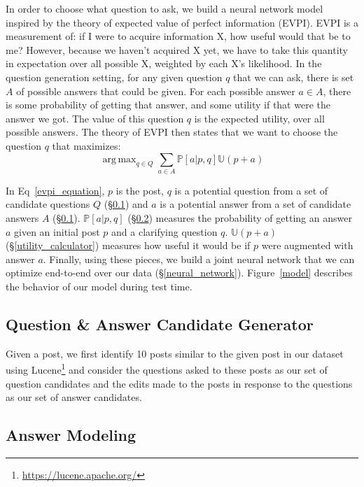 \documentclass[11pt,a4paper]{article}
\DeclareMathOperator*{\argmax}{arg\,max}
\newcommand{\U}{\mathbb{U}}
\begin{document}
In order to choose what question to ask, we build a neural network model inspired by the theory of expected value of perfect information (EVPI). EVPI is a measurement of: if I were to acquire information X, how useful would that be to me? However, because we haven't acquired X yet, we have to take this quantity in expectation over all possible X, weighted by each X's likelihood. In the question generation setting, for any given question $q$ that we can ask, there is set $A$ of possible answers that could be given. For each possible answer $a \in A$, there is some probability of getting that answer, and some utility if that were the answer we got. The value of this question $q$ is the expected utility, over all possible answers. The theory of EVPI then states that we want to choose the question $q$ that maximizes:
\begin{equation}\label{evpi_equation}
\argmax_{q \in Q} \sum_{a \in A} \mathbb{P}[a | p,q] \U(p+a)
\end{equation} 

In Eq~\ref{evpi_equation}, $p$ is the post, $q$ is a potential question from a set of candidate questions $Q$ (\S\ref{question_candidate_generator}) and $a$ is a potential answer from a set of candidate answers $A$ (\S\ref{question_candidate_generator}). $\mathbb{P}[a | p,q]$ (\S\ref{answer_modeling}) measures the probability of getting an answer $a$ given an initial post $p$ and a clarifying question $q$. $\U(p+a)$ (\S\ref{utility_calculator}) measures how useful it would be if $p$ were augmented with answer $a$. Finally, using these pieces, we build a joint neural network that we can optimize end-to-end over our data (\S\ref{neural_network}). Figure~\ref{model} describes the behavior of our model during test time. 

\subsection{Question \& Answer Candidate Generator}\label{question_candidate_generator}

Given a post, we first identify 10 posts similar to the given post in our dataset using Lucene\footnote{\url{https://lucene.apache.org/}} and consider the questions asked to these posts as our set of question candidates and the edits made to the posts in response to the questions as our set of answer candidates.

\subsection{Answer Modeling}\label{answer_modeling}
\end{document}
